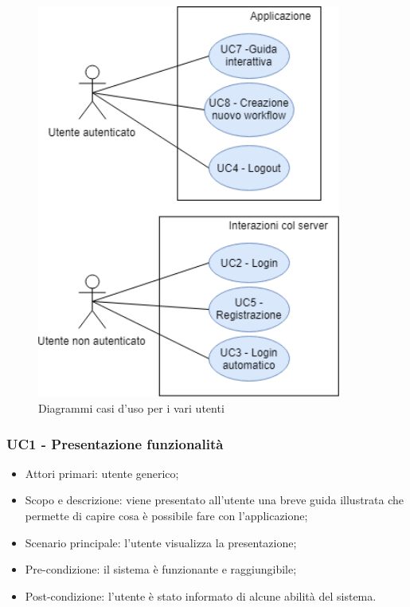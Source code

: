 \begin{figure}[H]
	\centering
	\includegraphics[width=10cm,keepaspectratio]{../includes/pics/figura2_RP.png}
	\caption{\label{fig:mission}Diagrammi casi d'uso per i vari utenti}
\end{figure}

\subsubsection{UC1 - Presentazione funzionalità}
\begin{itemize}
	\item  Attori primari: utente generico;
	\item  Scopo e descrizione: viene presentato all'utente una breve guida illustrata che permette di capire cosa è possibile fare con l'applicazione;
	\item  Scenario principale: l'utente visualizza la presentazione;
	\item  Pre-condizione: il sistema è funzionante e raggiungibile;
	\item  Post-condizione: l'utente è stato informato di alcune abilità del sistema.
\end{itemize}

